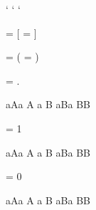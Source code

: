 \documentclass{article}
\begin{document}
\newXeTeXintercharclass \mycharclassa
\newXeTeXintercharclass \mycharclassA
\newXeTeXintercharclass \mycharclassB

\XeTeXcharclass `\a \mycharclassa
\XeTeXcharclass `\A \mycharclassA
\XeTeXcharclass `\B \mycharclassB

\XeTeXinterchartoks \mycharclassa \mycharclassA = {[\itshape}
\XeTeXinterchartoks \mycharclassA \mycharclassa = {\upshape]}

 \mycharclassB = {\color{blue}(}
\XeTeXinterchartoks {} = {)\color{black}}


\XeTeXinterchartoks \mycharclassB \mycharclassB = {.}



aAa A a B aBa BB 

\XeTeXinterchartokenstate = 1

aAa A a B aBa BB 

\XeTeXinterchartokenstate = 0

aAa A a B aBa BB 
\end{document}
